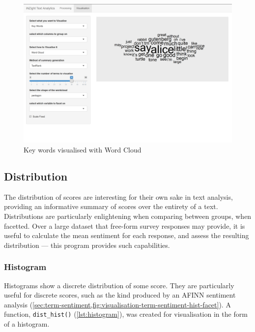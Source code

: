 \documentclass[11pt, a4paper, titlepage]{report}
\begin{document}
\begin{figure}
  \centering
  \includegraphics[scale=0.35]{visualisation-keywords-wordcloud.png}
  \caption{Key words visualised with Word
    Cloud\label{fig:visualisation-keywords-wordcloud}}
\end{figure}

\subsection{Distribution}\label{sec:distribution}

The distribution of scores are interesting for their own sake in text
analysis, providing an informative summary of scores over the entirety
of a text. Distributions are particularly enlightening when comparing
between groups, when facetted. Over a large dataset that free-form
survey responses may provide, it is useful to calculate the mean
sentiment for each response, and assess the resulting distribution ---
this program provides such capabilities.

\subsubsection{Histogram}\label{sec:histogram}

Histograms show a discrete distribution of some score. They are
particularly useful for discrete scores, such as the kind produced by
an AFINN sentiment analysis
(\underline{\cref{sec:term-sentiment,fig:visualisation-term-sentiment-hist-facet}}).
A function, \texttt{dist_hist()} (\cref{lst:histogram}), was
created for visualisation in the form of a histogram.
\end{document}
